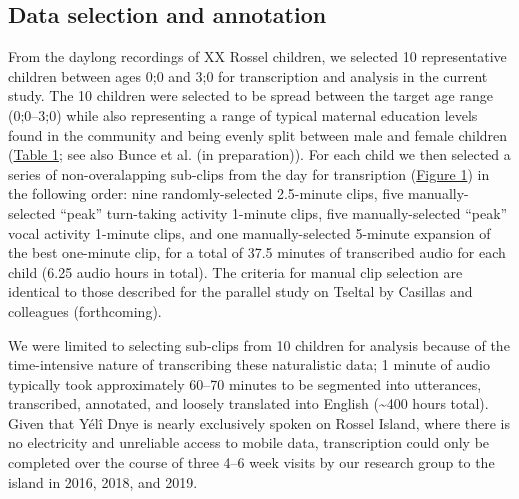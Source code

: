 \documentclass[,man,floatsintext]{apa6}
\begin{document}
\subsection{Data selection and annotation}\label{methods-samples}

From the daylong recordings of XX Rossel children, we selected 10
representative children between ages 0;0 and 3;0 for transcription and
analysis in the current study. The 10 children were selected to be
spread between the target age range (0;0--3;0) while also representing a
range of typical maternal education levels found in the community and
being evenly split between male and female children
(\protect\hyperlink{tab1}{Table 1}; see also Bunce et al. (in
preparation)). For each child we then selected a series of
non-overalapping sub-clips from the day for transription
(\protect\hyperlink{fig1}{Figure 1}) in the following order: nine
randomly-selected 2.5-minute clips, five manually-selected
\enquote{peak} turn-taking activity 1-minute clips, five
manually-selected \enquote{peak} vocal activity 1-minute clips, and one
manually-selected 5-minute expansion of the best one-minute clip, for a
total of 37.5 minutes of transcribed audio for each child (6.25 audio
hours in total). The criteria for manual clip selection are identical to
those described for the parallel study on Tseltal by Casillas and
colleagues (forthcoming).

We were limited to selecting sub-clips from 10 children for analysis
because of the time-intensive nature of transcribing these naturalistic
data; 1 minute of audio typically took approximately 60--70 minutes to
be segmented into utterances, transcribed, annotated, and loosely
translated into English (\textasciitilde{}400 hours total). Given that
Yélî Dnye is nearly exclusively spoken on Rossel Island, where there is
no electricity and unreliable access to mobile data, transcription could
only be completed over the course of three 4--6 week visits by our
research group to the island in 2016, 2018, and 2019.
\end{document}
